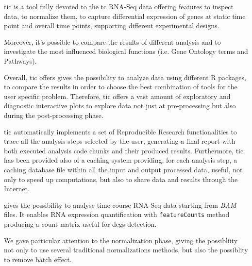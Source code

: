 \gls{tic} is a tool fully devoted to the \gls{tc} RNA-Seq data offering features to inspect data, to normalize them, to capture differential expression of genes at static time point and overall time points, supporting different experimental designs.

Moreover, it's possible to compare the results of different analysis and to investigate the most influenced biological functions (i.e. Gene Ontology terms and Pathways). 

Overall, \gls{tic} offers gives the possibility to analyze data using different R packages, to compare the results in order to choose the best combination of tools for the user specific problem. Therefore, \gls{tic} offers a vast amount of exploratory and diagnostic interactive plots to explore data not just at pre-processing but also during the post-processing phase. 

\gls{tic} automatically implements a set of Reproducible Research functionalities to trace all the analysis steps selected by the user, generating a final report with both executed analysis code chunks and their produced results. Furthermore, \gls{tic} has been provided also of a caching system providing, for each analysis step, a caching database file within all the input and output processed data, useful, not only to speed up computations, but also to share data and results through the Internet.


gives the possibility to analyse time course RNA-Seq data starting from \textit{BAM} files.
It enables RNA expression quantification with \lstinline!featureCounts! method producing a count matrix useful for \glspl{deg} detection.

We gave particular attention to the normalization phase, giving the possibliity not only to use several traditional normalizations methods, but also the possiblity to remove batch effect.


